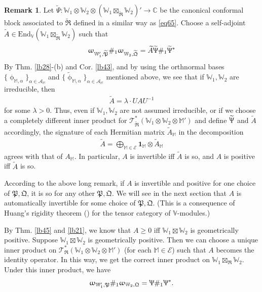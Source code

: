 \documentclass[11pt,b5paper,notitlepage]{article}
\theoremstyle{definition}
\newtheorem{rem}[df]{Remark}
\theoremstyle{plain}
\newcommand{\fk}{\mathfrak}
\newcommand{\mc}{\mathcal}
\newcommand{\wtd}{\widetilde}
\newcommand{\End}{\mathrm{End}} %
\newcommand{\id}{\mathbf{1}}
\newcommand{\scr}{\mathscr}
\newcommand{\Vbb}{\mathbb V}
\newcommand{\Wbb}{\mathbb W}
\newcommand{\Mbb}{\mathbb M}
\newcommand{\Cbb}{\mathbb C}
\numberwithin{equation}{section}
\begin{document}
\begin{rem}
Let $\wtd\Psi:\Wbb_1\otimes\Wbb_2\otimes(\Wbb_1\boxtimes_{\wtd{\fk R}}\Wbb_2)'\rightarrow\Cbb$ be the canonical conformal block associated to $\wtd{\fk R}$ defined in a similar way as \eqref{eq65}. Choose a self-adjoint $\wtd A\in\End_\Vbb(\Wbb_1\boxtimes_{\wtd{\fk R}}\Wbb_2)$ such that
\begin{align}
\upomega_{\Wbb_1',\wtd{\fk P}}\#_1\upomega_{\Wbb_2,\wtd{\fk Q}}=\wtd A\wtd\Uppsi\#_1\wtd\Uppsi^*
\end{align}
By Thm. \ref{lb28}-(b) and Cor. \ref{lb43}, and by using the orthnormal bases $\{\upphi_{\Mbb,\alpha}\}_{\alpha\in\mc A_\Mbb}$ and $\{\wtd\upphi_{\Mbb,\alpha}\}_{\alpha\in\mc A_\Mbb}$ mentioned above,  we see that if $\Wbb_1,\Wbb_2$ are irreducible, then 
\begin{align*}
\wtd A=\lambda\cdot  UAU^{-1}
\end{align*}
for some $\lambda>0$. Thus, even if $\Wbb_1,\Wbb_2$ are not assumed irreducible, or if we choose a completely different inner product for $\scr T_{\wtd{\fk R}}^*(\Wbb_1\otimes\Wbb_2\otimes\Mbb')$ and define $\wtd\Uppsi$ and $\wtd A$ accordingly, the signature of each Hermitian matrix $\wtd A_\Mbb$ in the decomposition
\begin{align*}
\wtd A=\bigoplus_{\Mbb\in\mc E}\id_\Mbb\otimes \wtd A_\Mbb
\end{align*}
agrees with that of $A_\Mbb$. In particular, $A$ is invertible iff $\wtd A$ is so, and $A$ is positive iff $\wtd A$ is so. \hfill\qedsymbol
\end{rem}


According to the above long remark, if  $A$ is invertible and positive for one choice of $\fk P,\fk Q$, it is so for any other $\fk P,\fk Q$. We will see in the next section that $A$ is automatically invertible for some choice of $\fk P,\fk Q$. (This is a consequence of Huang's rigidity theorem (\cite{Hua08}) for the tensor category of $\Vbb$-modules.) 

By Thm. \ref{lb45} and \ref{lb21}, we know that $A\geq 0$ iff $\Wbb_1\boxtimes\Wbb_2$ is geometrically positive. Suppose $\Wbb_1\boxtimes\Wbb_2$ is geometrically positive. Then we can choose a unique inner product on $\scr T_{\fk R}^*(\Wbb_1\otimes\Wbb_2\otimes\Mbb')$ (for each $\Mbb\in\mc E$) such that $A$ becomes the identity operator. In this way, we get the correct inner product on $\Wbb_1\boxtimes_{\fk R}\Wbb_2$. Under this inner product, we have
\begin{align}
\upomega_{\Wbb_1',\fk P}\#_1\upomega_{\Wbb_2,\fk Q}=\Uppsi\#_1\Uppsi^*.  \label{eq68}
\end{align}
\end{document}

